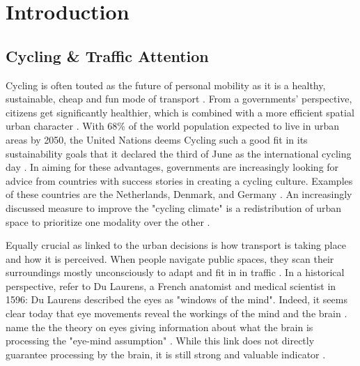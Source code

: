 \documentclass[sigconf, natbib=false, nonacm]{acmart}
\begin{document}
\section{Introduction}
    \subsection{Cycling \& Traffic Attention}
    Cycling is often touted as the future of personal mobility as it is a healthy, sustainable, cheap and fun mode of transport \cite{DeGeus2009, Hendriksen2010, St-Louis2014}. From a governments' perspective, citizens get significantly healthier, which is combined with a more efficient spatial urban character \cite{Nello-Deakin2019, Bruun1995}. With 68\% of the world population expected to live in urban areas by 2050, the United Nations deems Cycling such a good fit in its sustainability goals that it declared the third of June as the international cycling day \cite{UnitedNations2019, UnitedNations2018a, UnitedNations2018}. In aiming for these advantages, governments are increasingly looking for advice from countries with success stories in creating a cycling culture. Examples of these countries are the Netherlands, Denmark, and Germany \cite{Schepers2017}. An increasingly discussed measure to improve the "cycling climate" is a redistribution of urban space to prioritize one modality over the other \cite{Nello-Deakin2019, Gossling2020}. 
    
    Equally crucial as linked to the urban decisions is how transport is taking place and how it is perceived. When people navigate public spaces, they scan their surroundings mostly unconsciously to adapt and fit in in traffic \cite{HollanderJustinB.Sussman}. In a historical perspective, \citeauthor{VanGompel2007} refer to Du Laurens, a French anatomist and medical scientist in 1596: Du Laurens described the eyes as "windows of the mind". Indeed, it seems clear today that eye movements reveal the workings of the mind and the brain \cite{VanGompel2007}. \citeauthor{Just1980} name the the theory on eyes giving information about what the brain is processing the "eye-mind assumption" \cite{Just1980}. While this link does not directly guarantee processing by the brain, it is still strong and valuable indicator \cite{Berger2018}. 
    
\end{document}
